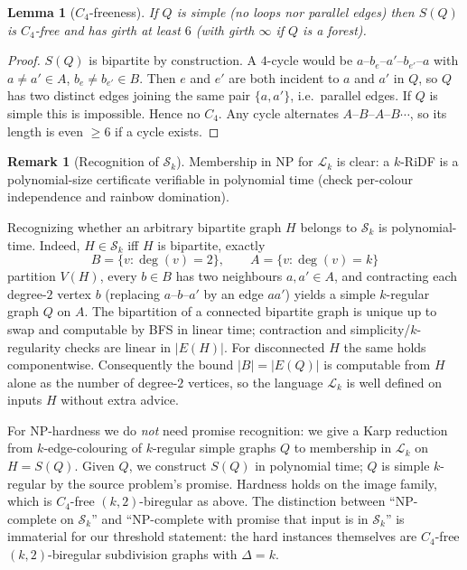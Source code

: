 \documentclass[11pt,a4paper]{article}
\theoremstyle{plain}
\newtheorem{lemma}[theorem]{Lemma}
\theoremstyle{definition}
\newtheorem{remark}[theorem]{Remark}
\newcommand{\cS}{\mathcal{S}}
\newcommand{\cL}{\mathcal{L}}
\begin{document}
\begin{lemma}[$C_{4}$-freeness]\label{lem:c4free}
If $Q$ is simple (no loops nor parallel edges) then $S(Q)$ is $C_{4}$-free and has girth at least $6$ (with girth $\infty$ if $Q$ is a forest).
\end{lemma}
\begin{proof}
$S(Q)$ is bipartite by construction.
A $4$-cycle would be $a$--$b_{e}$--$a'$--$b_{e'}$--$a$ with $a\neq a'\in A$, $b_{e}\neq b_{e'}\in B$. Then $e$ and $e'$ are both incident to $a$ and $a'$ in $Q$, so $Q$ has two distinct edges joining the same pair $\{a,a'\}$, i.e.\ parallel edges. If $Q$ is simple this is impossible. Hence no $C_{4}$. Any cycle alternates $A$--$B$--$A$--$B\cdots$, so its length is even $\ge 6$ if a cycle exists.
\end{proof}

\begin{remark}[Recognition of $\cS_{k}$]\label{rem:promise}
Membership in NP for $\cL_{k}$ is clear: a $k$-RiDF is a polynomial-size certificate verifiable in polynomial time (check per-colour independence and rainbow domination).

Recognizing whether an arbitrary bipartite graph $H$ belongs to $\cS_{k}$ is polynomial-time. Indeed, $H\in\cS_{k}$ iff $H$ is bipartite, exactly
\[
B=\{v:\deg(v)=2\},\qquad A=\{v:\deg(v)=k\}
\]
partition $V(H)$, every $b\in B$ has two neighbours $a,a'\in A$, and contracting each degree-$2$ vertex $b$ (replacing $a$--$b$--$a'$ by an edge $aa'$) yields a simple $k$-regular graph $Q$ on $A$. The bipartition of a connected bipartite graph is unique up to swap and computable by BFS in linear time; contraction and simplicity/$k$-regularity checks are linear in $|E(H)|$. For disconnected $H$ the same holds componentwise. Consequently the bound $|B|=|E(Q)|$ is computable from $H$ alone as the number of degree-$2$ vertices, so the language $\cL_{k}$ is well defined on inputs $H$ without extra advice.

For NP-hardness we do \emph{not} need promise recognition: we give a Karp reduction from $k$-edge-colouring of $k$-regular simple graphs $Q$ to membership in $\cL_{k}$ on $H=S(Q)$. Given $Q$, we construct $S(Q)$ in polynomial time; $Q$ is simple $k$-regular by the source problem's promise. Hardness holds on the image family, which is $C_{4}$-free $(k,2)$-biregular as above. The distinction between ``NP-complete on $\cS_{k}$'' and ``NP-complete with promise that input is in $\cS_{k}$'' is immaterial for our threshold statement: the hard instances themselves are $C_{4}$-free $(k,2)$-biregular subdivision graphs with $\Delta=k$.
\end{remark}
\end{document}
